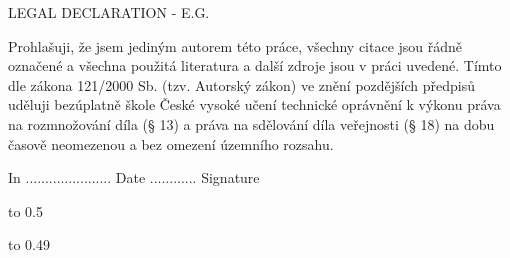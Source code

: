 \openright


\vspace*{\fill}


\noindent


\vspace{1cm}
LEGAL DECLARATION - E.G.

Prohlašuji, že jsem jediným autorem této práce, všechny citace jsou
řádně označené a všechna použitá literatura a další zdroje jsou v práci uvedené.
Tímto dle zákona 121/2000 Sb. (tzv. Autorský zákon) ve znění pozdějších předpisů uděluji
bezúplatně škole České vysoké učení technické oprávnění k výkonu práva na rozmnožování díla
(§ 13) a práva na sdělování díla veřejnosti (§ 18) na dobu časově neomezenou a bez omezení
územního rozsahu.


\noindent
In ......................  Date ............
\hspace{4cm}
Signature


\newpage


\openright

{\InfoPageFont

\vtop to 0.5

\vtop to 0.49
}

\newpage

\openright

